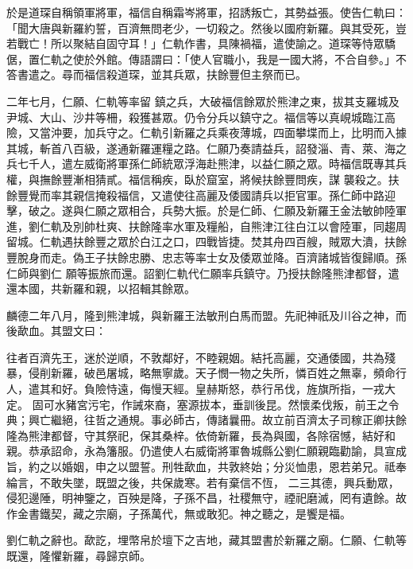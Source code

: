 \begin{pinyinscope}
 於是道琛自稱領軍將軍，福信自稱霜岑將軍，招誘叛亡，其勢益張。使告仁軌曰：「聞大唐與新羅約誓，百濟無問老少，一切殺之。然後以國府新羅。與其受死，豈若戰亡！所以聚結自固守耳！」仁軌作書，具陳禍福，遣使諭之。道琛等恃眾驕倨，置仁軌之使於外館。傳語謂曰：「使人官職小，我是一國大將，不合自參。」不答書遣之。尋而福信殺道琛，並其兵眾，扶餘豐但主祭而已。



 二年七月，仁願、仁軌等率留
 鎮之兵，大破福信餘眾於熊津之東，拔其支羅城及尹城、大山、沙井等柵，殺獲甚眾。仍令分兵以鎮守之。福信等以真峴城臨江高險，又當沖要，加兵守之。仁軌引新羅之兵乘夜薄城，四面攀堞而上，比明而入據其城，斬首八百級，遂通新羅運糧之路。仁願乃奏請益兵，詔發淄、青、萊、海之兵七千人，遣左威衛將軍孫仁師統眾浮海赴熊津，以益仁願之眾。時福信既專其兵權，與撫餘豐漸相猜貳。福信稱疾，臥於窟室，將候扶餘豐問疾，謀
 襲殺之。扶餘豐覺而率其親信掩殺福信，又遣使往高麗及倭國請兵以拒官軍。孫仁師中路迎擊，破之。遂與仁願之眾相合，兵勢大振。於是仁師、仁願及新羅王金法敏帥陸軍進，劉仁軌及別帥杜爽、扶餘隆率水軍及糧船，自熊津江往白江以會陸軍，同趨周留城。仁軌遇扶餘豐之眾於白江之口，四戰皆捷。焚其舟四百艘，賊眾大潰，扶餘豐脫身而走。偽王子扶餘忠勝、忠志等率士女及倭眾並降。百濟諸城皆復歸順。孫仁師與劉仁
 願等振旅而還。詔劉仁軌代仁願率兵鎮守。乃授扶餘隆熊津都督，遣還本國，共新羅和親，以招輯其餘眾。



 麟德二年八月，隆到熊津城，與新羅王法敏刑白馬而盟。先祀神祇及川谷之神，而後歃血。其盟文曰：



 往者百濟先王，迷於逆順，不敦鄰好，不睦親姻。結托高麗，交通倭國，共為殘暴，侵削新羅，破邑屠城，略無寧歲。天子憫一物之失所，憐百姓之無辜，頻命行人，遣其和好。負險恃遠，侮慢天經。皇赫斯怒，恭行吊伐，旌旗所指，一戎大定。
 固可水豬宮污宅，作誡來裔，塞源拔本，垂訓後昆。然懷柔伐叛，前王之令典；興亡繼絕，往哲之通規。事必師古，傳諸曩冊。故立前百濟太子司稼正卿扶餘隆為熊津都督，守其祭祀，保其桑梓。依倚新羅，長為與國，各除宿憾，結好和親。恭承詔命，永為籓服。仍遣使人右威衛將軍魯城縣公劉仁願親臨勸諭，具宣成旨，約之以婚姻，申之以盟誓。刑牲歃血，共敦終始；分災恤患，恩若弟兄。祗奉綸言，不敢失墜，既盟之後，共保歲寒。若有棄信不恆，
 二三其德，興兵動眾，侵犯邊陲，明神鑒之，百殃是降，子孫不昌，社稷無守，禋祀磨滅，罔有遺餘。故作金書鐵契，藏之宗廟，子孫萬代，無或敢犯。神之聽之，是饗是福。



 劉仁軌之辭也。歃訖，埋幣帛於壇下之吉地，藏其盟書於新羅之廟。仁願、仁軌等既還，隆懼新羅，尋歸京師。




\end{pinyinscope}
